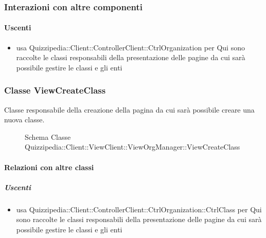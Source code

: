 \subsubsection{Interazioni con altre componenti}
\paragraph{Uscenti}
\begin{itemize}
\item usa Quizzipedia::Client::ControllerClient::CtrlOrganization per Qui sono raccolte le classi responsabili della presentazione delle pagine da cui sarà possibile gestire le classi e gli enti
\end{itemize}
\subsubsection{Classe ViewCreateClass}
Classe responsabile della creazione della pagina da cui sarà possibile creare una nuova classe.
\begin{figure}[H]
\centering
\noindent{}
\caption[Schema Classe ViewCreateClass]{Schema Classe Quizzipedia::Client::ViewClient::ViewOrgManager::ViewCreateClass}
\end{figure}
\paragraph{Relazioni con altre classi}
\subparagraph{Uscenti}
\begin{itemize}
\item usa Quizzipedia::Client::ControllerClient::CtrlOrganization::CtrlClass per Qui sono raccolte le classi responsabili della presentazione delle pagine da cui sarà possibile gestire le classi e gli enti
\end{itemize}
